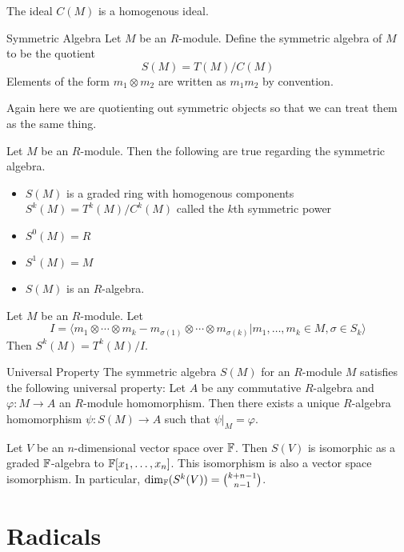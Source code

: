 \documentclass[a4paper]{article}
\begin{document}
\begin{lmm}{}{} The ideal $C(M)$ is a homogenous ideal. 
\end{lmm}

\begin{defn}{Symmetric Algebra}{} Let $M$ be an $R$-module. Define the symmetric algebra of $M$ to be the quotient $$S(M)=T(M)/C(M)$$ Elements of the form $m_1\otimes m_2$ are written as $m_1m_2$ by convention. 
\end{defn}

Again here we are quotienting out symmetric objects so that we can treat them as the same thing. 

\begin{prp}{}{} Let $M$ be an $R$-module. Then the following are true regarding the symmetric algebra. 
\begin{itemize}
\item $S(M)$ is a graded ring with homogenous components $S^k(M)=T^k(M)/C^k(M)$ called the $k$th symmetric power
\item $S^0(M)=R$
\item $S^1(M)=M$
\item $S(M)$ is an $R$-algebra. 
\end{itemize}
\end{prp}

\begin{thm}{}{} Let $M$ be an $R$-module. Let $$I=\langle m_1\otimes\cdots\otimes m_k-m_{\sigma(1)}\otimes\cdots\otimes m_{\sigma(k)}|m_1,\dots,m_k\in M, \sigma\in S_k\rangle$$ Then $S^k(M)=T^k(M)/I$. 
\end{thm}

\begin{thm}{Universal Property}{} The symmetric algebra $S(M)$ for an $R$-module $M$ satisfies the following universal property: Let $A$ be any commutative $R$-algebra and $\varphi:M\to A$ an $R$-module homomorphism. Then there exists a unique $R$-algebra homomorphism $\psi:S(M)\to A$ such that $\psi|_M=\varphi$. 
\end{thm}

\begin{crl}{}{} Let $V$ be an $n$-dimensional vector space over $\mathbb{F}$. Then $S(V)$ is isomorphic as a graded $\mathbb{F}$-algebra to $\mathbb{F}[x_1,\dots,x_n]$. This isomorphism is also a vector space isomorphism. In particular, $\dim_{\mathbb{F}}(S^k(V))=\binom{k+n-1}{n-1}$. 
\end{crl}

\pagebreak
\section{Radicals}
\end{document}
